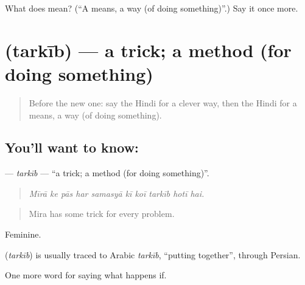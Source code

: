 \begin{tcolorbox}[breakable,colback=teal!4,colframe=teal!35!black,title={Before you move on}]
What does  mean? (\textquotedblleft{}A means, a way (of doing something)\textquotedblright{}.) Say it once more.
\end{tcolorbox}
\section[\texorpdfstring{\hi{तरकीब} (tarkīb)}{तरकीब (tarkīb)}]{ (tarkīb) — a trick; a method (for doing something)}

\label{lesson:HI-C540-tarkib}



\begin{quote}
Before the new one: say the Hindi for a clever way, then the Hindi for a means, a way (of doing something).
\end{quote}

\subsection*{You'll want to know: }
\textbf{} — \emph{tarkīb} — \textquotedblleft{}a trick; a method (for doing something)\textquotedblright{}.

\begin{quote}
         
\end{quote}

\begin{quote}
\emph{Mīrā ke pās har samasyā kī koī tarkīb hotī hai.}
\end{quote}

\begin{quote}
Mira has some trick for every problem.
\end{quote}

Feminine.

\begin{cousinweb}
\textbf{} (\emph{tarkīb}) is usually traced to Arabic \emph{tarkīb}, \textquotedblleft{}putting together\textquotedblright{}, through Persian.
\end{cousinweb}

\begin{grammarlens}[title={What you've built}]
One more word for saying what happens if.
\end{grammarlens}

